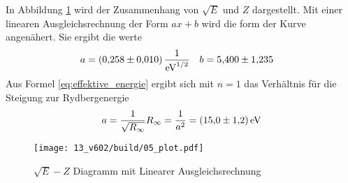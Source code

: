 In Abbildung \ref{fig:05} wird der Zusammenhang von $\sqrt{E}$ und $Z$ dargestellt.
Mit einer linearen Ausgleichsrechnung der Form $ax +b$ wird die form der Kurve angenähert.
Sie ergibt die werte
\begin{align}
    a &= \qty{0.258 \pm 0.010}{\electronvolt\tothe{-1/2}} &
    b &= \num{5.400 \pm 1.235}
\end{align}
Aus Formel \eqref{eq:effektive_energie} ergibt sich mit $n=1$ das Verhältnis für die Steigung zur Rydbergenergie
\begin{align*}
    a = \frac{1}{\sqrt{R_\infty}}
    R_\infty = \frac{1}{a^2} = \qty{15 \pm 1.2}{\eV}
\end{align*}


\begin{figure}
    \texttt{[image: 13\_v602/build/05\_plot.pdf]}
    \caption{$\sqrt{E}-Z$ Diagramm mit Linearer Ausgleichsrechnung }
    \label{fig:05}
\end{figure}


